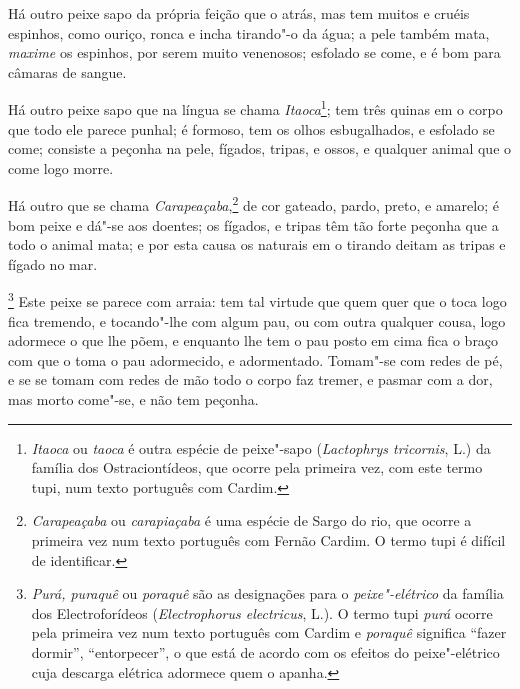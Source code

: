 \begin{linenumbers}
 Há outro peixe sapo da própria feição que o atrás, mas tem muitos e
cruéis espinhos, como ouriço, ronca e incha tirando"-o da água; a pele
também mata, \textit{maxime} os espinhos, por serem muito venenosos; esfolado se
come, e é bom para câmaras de sangue.

 Há outro peixe sapo que na língua se chama 
 \textit{Itaoca}\footnote{ \textit{Itaoca} ou \textit{taoca} é outra espécie de peixe"-sapo
(\textit{Lactophrys tricornis}, L.) da família dos Ostraciontídeos, que
ocorre pela primeira vez, com este termo tupi, num texto português com
Cardim.}; tem três quinas em o corpo que todo ele parece punhal; é
formoso, tem os olhos esbugalhados, e esfolado se come; consiste a
peçonha na pele, fígados, tripas, e ossos, e qualquer animal que o come
logo morre.

 Há outro que se chama \textit{Carapeaçaba},\footnote{ \textit{Carapeaçaba} 
ou \textit{carapiaçaba} é uma espécie de Sargo
do rio, que ocorre a primeira vez num texto português com Fernão
Cardim. O termo tupi é difícil de identificar.} de cor gateado, pardo,
preto, e amarelo; é bom peixe e dá"-se aos doentes; os fígados, e tripas
têm tão forte peçonha que a todo o animal mata; e por esta causa os
naturais em o tirando deitam as tripas e fígado no mar.

\footnote{ \textit{Purá, puraquê} ou
\textit{poraquê} são as designações para o \textit{peixe"-elétrico}
da família dos Electroforídeos (\textit{Electrophorus electricus}, L.).
O termo tupi \textit{purá} ocorre pela primeira vez num texto
português com Cardim e \textit{poraquê} significa ``fazer dormir'',
``entorpecer'', o que está de acordo com os efeitos do peixe"-elétrico
cuja descarga elétrica adormece quem o apanha.} Este peixe
se parece com arraia: tem tal virtude que quem quer que o toca logo
fica tremendo, e tocando"-lhe com algum pau, ou com outra qualquer
cousa, logo adormece o que lhe põem, e enquanto lhe tem o pau posto em
cima fica o braço com que o toma o pau adormecido, e adormentado.
Tomam"-se com redes de pé, e se se tomam com redes de mão todo o corpo
faz tremer, e pasmar com a dor, mas morto come"-se, e não tem peçonha.


\end{linenumbers}
